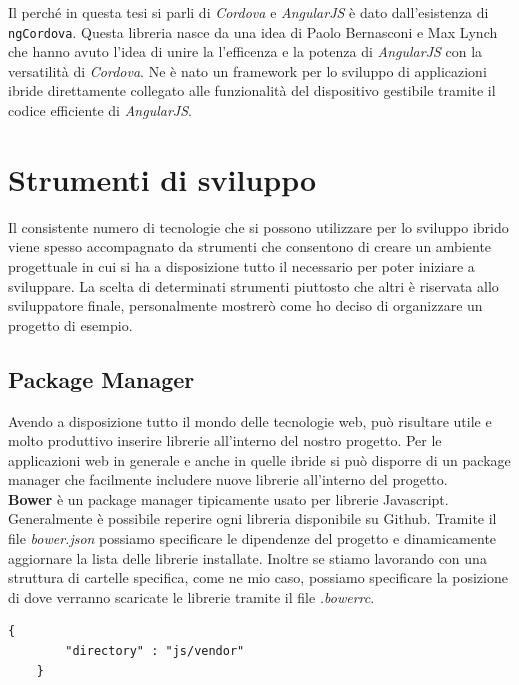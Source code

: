 Il perché in questa tesi si parli di \emph{Cordova} e \emph{AngularJS} è dato dall'esistenza di \texttt{ngCordova}. Questa libreria nasce da una idea di Paolo Bernasconi e Max Lynch che hanno avuto l'idea di unire la l'efficenza e la potenza di \emph{AngularJS} con la versatilità di \emph{Cordova}. Ne è nato un framework per lo sviluppo di applicazioni ibride direttamente collegato alle funzionalità del dispositivo gestibile tramite il codice efficiente di \emph{AngularJS}.\\

\section{Strumenti di sviluppo}

Il consistente numero di tecnologie che si possono utilizzare per lo sviluppo ibrido viene spesso accompagnato da strumenti che consentono di creare un ambiente progettuale in cui si ha a disposizione tutto il necessario per poter iniziare a sviluppare. La scelta di determinati strumenti piuttosto che altri è riservata allo sviluppatore finale, personalmente mostrerò come ho deciso di organizzare un progetto di esempio.

\subsection{Package Manager}

Avendo a disposizione tutto il mondo delle tecnologie web, può risultare utile e molto produttivo inserire librerie all'interno del nostro progetto. Per le applicazioni web in generale e anche in quelle ibride si può disporre di un package manager che facilmente includere nuove librerie all'interno del progetto.\\

\textbf{Bower} è un package manager tipicamente usato per librerie Javascript. Generalmente è possibile reperire ogni libreria disponibile su Github. Tramite il file \emph{bower.json} possiamo specificare le dipendenze del progetto e dinamicamente aggiornare la lista delle librerie installate. Inoltre se stiamo lavorando con una struttura di cartelle specifica, come ne mio caso, possiamo specificare la posizione di dove verranno scaricate le librerie tramite il file \emph{.bowerrc}. 

\begin{lstlisting}[language=html,caption={Una tipica configurazione del file .bowerrc},
				   label={lst:bowerrc}]
	{
		"directory" : "js/vendor"
	}
\end{lstlisting}

